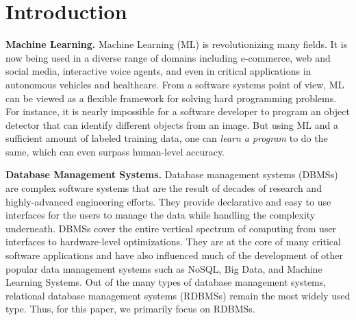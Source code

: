 \section{Introduction}

\vspace{2mm}
\noindent \textbf{Machine Learning.} Machine Learning (ML) is revolutionizing many fields.
It is now being used in a diverse range of domains including e-commerce, web and social media, interactive voice agents, and even in critical applications in autonomous vehicles and healthcare.
From a software systems point of view, ML can be viewed as a flexible framework for solving hard programming problems.
For instance, it is nearly impossible for a software developer to program an object detector that can identify different objects from an image.
But using ML and a sufficient amount of labeled training data, one can \textit{learn a program} to do the same, which can even surpass human-level accuracy.

\vspace{2mm}
\noindent \textbf{Database Management Systems.} Database management systems (DBMSs) are complex software systems that are the result of decades of research and highly-advanced engineering efforts.
They provide declarative and easy to use interfaces for the users to manage the data while handling the complexity underneath.
DBMSs cover the entire vertical spectrum of computing from user interfaces to hardware-level optimizations.
They are at the core of many critical software applications and have also influenced much of the development of other popular data management systems such as NoSQL, Big Data, and Machine Learning Systems.
Out of the many types of database management systems, relational database management systems (RDBMSs) remain the most widely used type.
Thus, for this paper, we primarily focus on RDBMSs.

